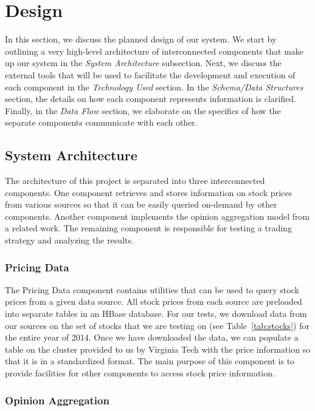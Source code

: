 
\section{Design}

In this section, we discuss the planned design of our system.
We start by outlining a very high-level architecture of interconnected components that make up our system in the \textit{System Architecture} subsection.
Next, we discuss the external tools that will be used to facilitate the development and execution of each component in the \textit{Technology Used} section.
In the \textit{Schema/Data Structures} section, the details on how each component represents information is clarified.
Finally, in the \textit{Data Flow} section, we elaborate on the specifics of how the separate components communicate with each other.

\subsection{System Architecture}

The architecture of this project is separated into three interconnected components.
One component retrieves and stores information on stock prices from various sources so that it can be easily queried on-demand by other components.
Another component implements the opinion aggregation model from a related work.
The remaining component is responsible for testing a trading strategy and analyzing the results.

\subsubsection{Pricing Data}

The Pricing Data component contains utilities that can be used to query stock prices from a given data source.
All stock prices from each source are preloaded into separate tables in an HBase \cite{hbase} database.
For our tests, we download data from our sources on the set of stocks that we are testing on (see Table~\ref{tab:stocks}) for the entire year of 2014.
Once we have downloaded the data, we can populate a table on the cluster provided to us by Virginia Tech with the price information so that it is in a standardized format.
The main purpose of this component is to provide facilities for other components to access stock price information.

\subsubsection{Opinion Aggregation}

